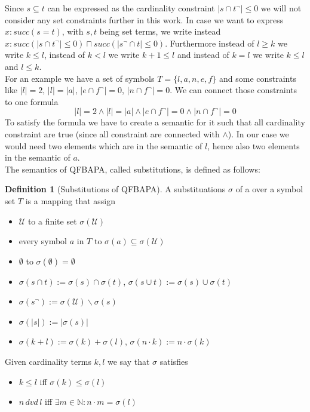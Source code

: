 \documentclass{book}
\theoremstyle{break}
\theoremstyle{definition}
\newtheorem{mydef}{Definition}
\begin{document}
Since $s\subseteq t$ can be expressed as the cardinality constraint $|s\cap t^\neg|\leq 0$ we will not consider any set constraints further in this work. In case we want to express $x:succ(s=t)$, with $s,t$ being set terms, we write instead $x:succ(|s\cap t^\neg|\leq 0)\sqcap succ(|s^\neg\cap t|\leq 0)$. Furthermore instead of $l\geq k$ we write $k\leq l$, instead of $k<l$ we write $k+1\leq l$ and instead of $k=l$ we write $k\leq l$ and $l\leq k$.\\
For an example we have a set of symbols $T=\{l, a, n, e, f\}$ and some constraints like $|l|=2$, $|l|=|a|$, $|e\cap f^\neg|=0$, $|n\cap f^\neg|=0$. We can connect those constraints to one formula 
\begin{equation}
|l|=2\wedge|l|=|a|\wedge |e\cap f^\neg|=0\wedge |n\cap f^\neg|=0
\end{equation}
To satisfy the formula we have to create a semantic for it such that all cardinality constraint are true (since all constraint are connected with $\wedge$). In our case we would need two elements which are in the semantic of $l$, hence also two elements in the semantic of $a$.\\
The semantics of QFBAPA, called substitutions, is defined as follows:
\begin{mydef}[Substitutions of QFBAPA]
A substituations $\sigma$ of a over a symbol set $T$ is a mapping that assign
\begin{itemize}
\item $\mathcal{U}$ to a finite set $\sigma(\mathcal{U})$
\item every symbol $a$ in $T$ to $\sigma(a)\subseteq\sigma(\mathcal{U})$
\item $\emptyset$ to $\sigma(\emptyset)=\emptyset$
\item $\sigma(s\cap t):= \sigma(s)\cap \sigma(t)$, $\sigma(s\cup t):= \sigma(s)\cup \sigma(t)$
\item $\sigma(s^\neg):=\sigma(\mathcal{U})\backslash \sigma(s)$
\item $\sigma(|s|):=|\sigma(s)|$
\item $\sigma(k+l):=\sigma(k)+\sigma(l)$, $\sigma(n\cdot k):= n\cdot \sigma(k)$
\end{itemize}
Given cardinality terms $k,l$ we say that $\sigma$ satisfies
\begin{itemize}
\item $k\leq l$ iff $\sigma(k)\leq \sigma(l)$
\item $n\,dvd\,l$ iff $\exists m\in\mathbb{N}:n\cdot m = \sigma(l)$
\end{itemize}
\end{mydef}
\end{document}
